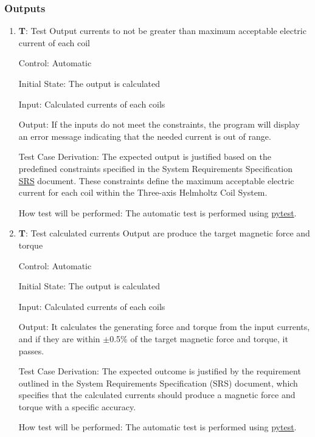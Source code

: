 \documentclass[12pt, titlepage]{article}
\newcounter{testCase}
\newcommand{\testCaseFormat}{T\thetestCase}
\begin{document}
\subsubsection{Outputs}\label{subsec:Outputs}
\begin{enumerate}

\item{\textbf{\testCaseFormat \label{T_output1}}: Test Output currents to not be greater than maximum acceptable electric current of each coil\label{subsec:Outputs1}}

Control: Automatic
					
Initial State: The output is calculated
					
Input: Calculated currents of each coils 
			
Output: If the inputs do not meet the constraints, the program will display an error message indicating that the needed current is out of range.

Test Case Derivation: The expected output is justified based on the predefined constraints specified in the System Requirements Specification  \href{https://github.com/rnorouziani/Helmholtz-Coil-Current-Calculator-CAS741/blob/main/docs/SRS/SRS.pdf}{SRS} document. These constraints define the maximum acceptable electric current for each coil within the Three-axis Helmholtz Coil System.				

How test will be performed: The automatic test is performed using \href{https://docs.pytest.org/en/8.0.x/}{pytest}.

\item{\textbf{\testCaseFormat \label{T_output2}}: Test calculated currents Output are produce the target magnetic force and torque}

Control: Automatic
					
Initial State: The output is calculated
					
Input: Calculated currents of each coils 
			
Output: It calculates the generating force and torque from the input currents, and if they are within $\pm$0.5\% of the target magnetic force and torque, it passes.

Test Case Derivation: The expected outcome is justified by the requirement outlined in the System Requirements Specification (SRS) document, which specifies that the calculated currents should produce a magnetic force and torque with a specific accuracy. 				

How test will be performed: The automatic test is performed using \href{https://docs.pytest.org/en/8.0.x/}{pytest}.
			
\end{enumerate}
\end{document}
